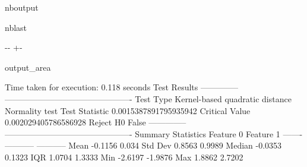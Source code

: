 \documentclass[letterpaper,10pt,english,openany,oneside]{sphinxmanual}
\begin{document}
\begin{sphinxuseclass}{nboutput}
\begin{sphinxuseclass}{nblast}
{

\kern-\sphinxverbatimsmallskipamount\kern-\baselineskip
\kern+\FrameHeightAdjust\kern-\fboxrule
\vspace{\nbsphinxcodecellspacing}

\begin{sphinxuseclass}{output_area}
\begin{sphinxuseclass}{}


\begin{sphinxVerbatim}[commandchars=\\\{\}]
Time taken for execution: 0.118 seconds
Test Results
--------------  ----------------------------------------------
Test Type       Kernel-based quadratic distance Normality test
Test Statistic  0.0015387891795935942
Critical Value  0.002029405786586928
Reject H0       False
--------------  ----------------------------------------------
Summary Statistics
           Feature 0    Feature 1
-------  -----------  -----------
Mean         -0.1156       0.034
Std Dev       0.8563       0.9989
Median       -0.0353       0.1323
IQR           1.0704       1.3333
Min          -2.6197      -1.9876
Max           1.8862       2.7202
\end{sphinxVerbatim}



\end{sphinxuseclass}
\end{sphinxuseclass}
}

\end{sphinxuseclass}
\end{sphinxuseclass}
\end{document}
